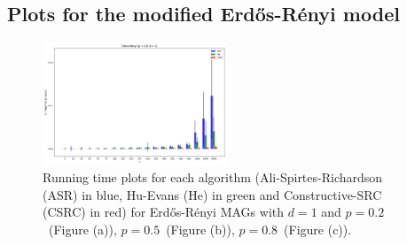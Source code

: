\documentclass[a4paper]{article}
\begin{document}
\pagebreak

\subsection{Plots for the modified Erd\H{o}s-R\'{e}nyi model}

\begin{figure}[htbp]
	\centering
	\hfill
	
	\includegraphics[width=0.49\textwidth]{figures/Figure_3.png}
	
	\caption{Running time plots for each algorithm (Ali-Spirtes-Richardson (ASR) in blue, Hu-Evans (He) in green and Constructive-SRC (CSRC) in red) for Erd\H{o}s-R\'{e}nyi MAGs with $d=1$ and $p=0.2$~(Figure (a)), $p=0.5$~(Figure (b)), $p=0.8$~(Figure (c)).}
	\label{fig:er-1-ap}
\end{figure}
\end{document}
